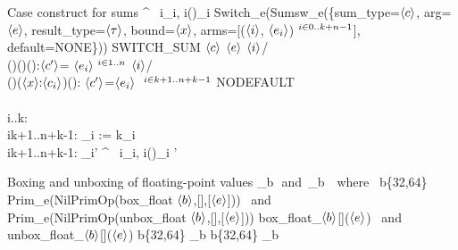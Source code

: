 \documentclass[12pt,twoside,fleqn]{article}
\begin{document}
 {Case construct for sums}
 {^{\ctype}\,\expression\,\,
    i\to\expression_i,
    i\to(\evar)\expression_i}
 {Switch\_e(Sumsw\_e(\{sum\_type=$\langle{c}\rangle$, 
                     arg=$\langle{e}\rangle$,
                     result\_type=$\langle{\tau}\rangle$, 
                     bound=$\langle{x}\rangle$,
                     arms=[($\langle{i}\rangle$, $\langle{e_i}\rangle$)$\ {}^{i\in 0..k+n-1}$],
                     default=NONE\}))}
 {SWITCH\_SUM $\langle{c}\rangle$ $\langle{e}\rangle$
            $\langle{i}\rangle$/\\()()(){:}$\langle{c'}\rangle$=%
         $\langle{e_i}\rangle\ {}^{i\in 1..n}$
            $\langle{i}\rangle$/\\()($\langle{x}\rangle{:}\langle{c_i}\rangle$)(){:}%
              $\langle{c'}\rangle$=$\langle{e_i}\rangle$%
         $\ {}^{i\in k+1..n+k-1}$
         NODEFAULT}
 {}
 {\irule
   {\validexpression{\context}{\expression}{\constructor}\\
    \equivconstructor{\context}{\constructor}
      {}{\ktype}\\
    \forall i..k:\quad 
       \\
    \forall i\in k{+}1..n{+}k{-}1:\quad
       \constructor_i := 
           {k}{\constructor_i}\\
    \forall i\in k{+}1..n{+}k{-}1:\quad
            {\expression_i}{\constructor'}}
   {\validexpression{\context}
    {^{\constructor}\,\expression\,\,
      i\to\expression_i,
      i\to(\evar)\expression_i}
    {\constructor'}}
 }
 

 {Boxing and unboxing of floating-point values}
 {_b\,\expression\mbox{\ and\ }_b\,\expression
   \mbox{\ where\ }  b\in\{32,64\}}
 {Prim\_e(NilPrimOp(box\_float $\langle{b}\rangle$,[],[$\langle{e}\rangle$]))
   \textrm{\ and\ }
  Prim\_e(NilPrimOp(unbox\_float $\langle{b}\rangle$,[],[$\langle{e}\rangle$]))}
 {box\_float\_$\langle{b}\rangle$[]($\langle{e}\rangle$)
   \textrm{\ and\ }
  unbox\_float\_$\langle{b}\rangle$[]($\langle{e}\rangle$)}
 {}
 {\irule
    {
     \qquad b\in\{32,64\}}
    {
      {_b}}
  \irule
    {
     \qquad b\in\{32,64\}}
    {
      {_b}}}
\end{document}
